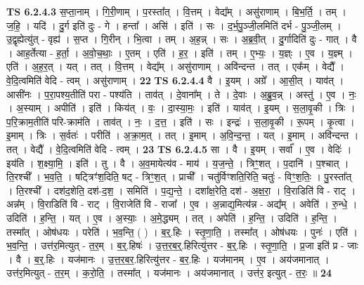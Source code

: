 \documentclass[17pt]{extarticle}
\begin{document}
                  \newline
                                \textbf{ TS 6.2.4.3} \newline
                  स॒प्ता॒नाम् । गि॒री॒णाम् । प॒रस्ता᳚त् । वि॒त्तम् । वेद्य᳚म् । असु॑राणाम् । बि॒भ॒र्ति॒ । तम् । ज॒हि॒ । यदि॑ । दु॒र्ग इति॑ दुः - गे । हन्ता᳚ । असि॑ । इति॑ । सः । द॒र्भ॒पु॒ञ्जी॒लमिति॑ दर्भ - पु॒ञ्जी॒लम् । उ॒द्वृह्येत्यु॑त् - वृह्य॑ । स॒प्त । गि॒रीन् । भि॒त्वा । तम् । अ॒ह॒न्न् । सः । अ॒ब्र॒वी॒त् । दु॒र्गादिति॑ दुः - गात् । वै । आह॒र्तेत्या - ह॒र्ता॒ । अ॒वो॒च॒थाः॒ । ए॒तम् । एति॑ । ह॒र॒ । इति॑ । तम् । ए॒भ्यः॒ । य॒ज्ञ्ः । ए॒व । य॒ज्ञ्म् । एति॑ । अ॒ह॒र॒त् । यत् । तत् । वि॒त्तम् । वेद्य᳚म् । असु॑राणाम् । अवि॑न्दन्त । तत् । एक᳚म् । वेद्यै᳚ । वे॒दि॒त्वमिति॑ वेदि - त्वम् । असु॑राणाम् । \textbf{  22} \newline
                  \newline
                                \textbf{ TS 6.2.4.4} \newline
                  वै । इ॒यम् । अग्रे᳚ । आ॒सी॒त् । याव॑त् । आसी॑नः । प॒रा॒पश्य॒तीति॑ परा - पश्य॑ति । ताव॑त् । दे॒वाना᳚म् । ते । दे॒वाः । अ॒ब्रु॒व॒न्न् । अस्तु॑ । ए॒व । नः॒ । अ॒स्याम् । अपीति॑ । इति॑ । किय॑त् । वः॒ । दा॒स्या॒मः॒ । इति॑ । याव॑त् । इ॒यम् । स॒ला॒वृ॒की । त्रिः । प॒रि॒क्राम॒तीति॑ परि-क्राम॑ति । ताव॑त् । नः॒ । द॒त्त॒ । इति॑ । सः । इन्द्रः॑ । स॒ला॒वृ॒की । रू॒पम् । कृ॒त्वा । इ॒माम् । त्रिः । स॒र्वतः॑ । परीति॑ । अ॒क्रा॒म॒त् । तत् । इ॒माम् । अ॒वि॒न्द॒न्त॒ । यत् । इ॒माम् । अवि॑न्दन्त । तत् । वेद्यै᳚ । वे॒दि॒त्वमिति॑ वेदि - त्वम् । \textbf{  23} \newline
                  \newline
                                \textbf{ TS 6.2.4.5} \newline
                  सा । वै । इ॒यम् । सर्वा᳚ । ए॒व । वेदिः॑ । इय॑ति । श॒क्ष्या॒मि॒ । इति॑ । तु । वै । अ॒व॒मायेत्य॑व - माय॑ । य॒ज॒न्ते॒ । त्रिꣳ॒॒शत् । प॒दानि॑ । प॒श्चात् । ति॒रश्ची᳚ । भ॒व॒ति॒ । षट्त्रिꣳ॑श॒दिति॒ षट् - त्रिꣳ॒॒श॒त् । प्राची᳚ । चतु॑र्विꣳशति॒रिति॒ चतुः॑ - विꣳ॒॒श॒तिः॒ । पु॒रस्ता᳚त् । ति॒रश्ची᳚ । दश॑द॒शेति॒ दश॑-द॒श॒ । समिति॑ । प॒द्य॒न्ते॒ । दशा᳚क्ष॒रेति॒ दश॑ - अ॒क्ष॒रा॒ । वि॒राडिति॑ वि - राट् । अन्न᳚म् । वि॒राडिति॑ वि - राट् । वि॒राजेति॑ वि - राजा᳚ । ए॒व । अ॒न्नाद्य॒मित्य॑न्न - अद्य᳚म् । अवेति॑ । रु॒न्धे॒ । उदिति॑ । ह॒न्ति॒ । यत् । ए॒व । अ॒स्याः॒ । अ॒मे॒द्ध्यम् । तत् । अपेति॑ । ह॒न्ति॒ । उदिति॑ । ह॒न्ति॒ । तस्मा᳚त् । ओष॑धयः । परेति॑ । भ॒व॒न्ति॒ ( ) । ब॒र्॒.हिः । स्तृ॒णा॒ति॒ । तस्मा᳚त् । ओष॑धयः । पुनः॑ । एति॑ । भ॒व॒न्ति॒ । उत्त॑र॒मित्युत् - त॒र॒म् । ब॒र्॒.हिषः॑ । उ॒त्त॒र॒ब॒र्॒.हिरित्यु॑त्तर - ब॒र्॒.हिः । स्तृ॒णा॒ति॒ । प्र॒जा इति॑ प्र - जाः । वै । ब॒र्॒.हिः । यज॑मानः । उ॒त्त॒र॒ब॒र॒.हिरित्यु॑त्तर - ब॒र॒.हिः । यज॑मानम् । ए॒व । अय॑जमानात् । उत्त॑र॒मित्युत् - त॒र॒म् । क॒रो॒ति॒ । तस्मा᳚त् । यज॑मानः । अय॑जमानात् । उत्त॑र॒ इत्युत् - त॒रः॒ ॥ \textbf{  24} \newline
\end{document}

